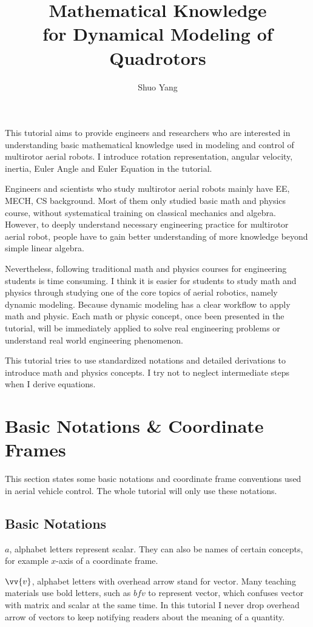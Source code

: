 \documentclass[11pt]{article}
\begin{document}
\title{Mathematical Knowledge\\ for Dynamical Modeling of Quadrotors}
\author{Shuo Yang}
\maketitle
This tutorial aims to provide engineers and researchers who are interested in understanding basic mathematical knowledge used in modeling and control of multirotor aerial robots. I introduce rotation representation, angular velocity, inertia, Euler Angle and Euler Equation in the tutorial.

Engineers and scientists who study multirotor aerial robots mainly have EE, MECH, CS background. Most of them only studied basic math and physics course, without systematical training on classical mechanics and algebra. However, to deeply understand necessary engineering practice for multirotor aerial robot, people have to gain better understanding of more knowledge beyond simple linear algebra.

Nevertheless, following traditional math and physics courses for engineering students is time consuming. I think it is easier for students to study math and physics through studying one of the core topics of aerial robotics, namely dynamic modeling. Because dynamic modeling has a clear workflow to apply math and physic. Each math or physic concept, once been presented in the tutorial, will be immediately applied to solve real engineering problems or understand real world engineering phenomenon.

This tutorial tries to use standardized notations and detailed derivations to introduce math and physics concepts. I try not to neglect intermediate steps when I derive equations.

\section{Basic Notations \& Coordinate Frames}
This section states some basic notations and coordinate frame conventions used in aerial vehicle control. The whole tutorial will only use these notations.
\subsection{Basic Notations}
$a$, alphabet letters represent scalar. They can also be names of certain concepts, for example $x$-axis of a coordinate frame.

$\vv{v}$, alphabet letters with overhead arrow stand for vector. Many teaching materials use bold letters, such as $bf{v}$ to represent vector, which confuses vector with matrix and scalar at the same time. In this tutorial I never drop overhead arrow of vectors to keep notifying readers about the meaning of a quantity.
\end{document}
